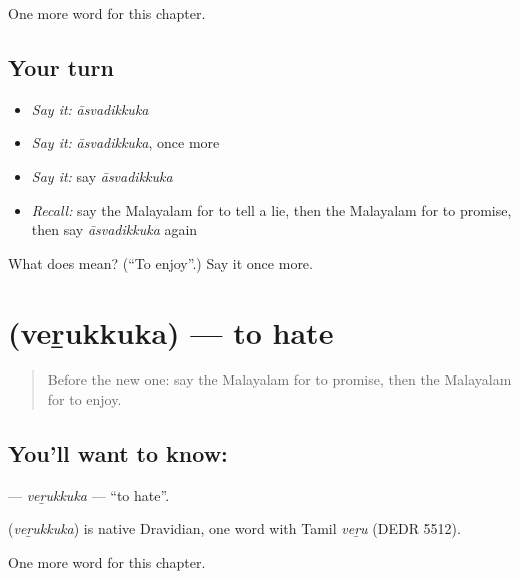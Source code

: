 \begin{grammarlens}[title={What you've built}]
One more word for this chapter.
\end{grammarlens}

\subsection*{Your turn}
\begin{itemize}
\raggedright
  \item \emph{Say it:} \emph{āsvadikkuka}
  \item \emph{Say it:} \emph{āsvadikkuka}, once more
  \item \emph{Say it:} say \emph{āsvadikkuka}
  \item \emph{Recall:} say the Malayalam for to tell a lie, then the Malayalam for to promise, then say \emph{āsvadikkuka} again
\end{itemize}

\begin{tcolorbox}[breakable,colback=teal!4,colframe=teal!35!black,title={Before you move on}]
What does  mean? (\textquotedblleft{}To enjoy\textquotedblright{}.) Say it once more.
\end{tcolorbox}
\section[\texorpdfstring{\ml{വെറുക്കുക} (veṟukkuka)}{വെറുക്കുക (veṟukkuka)}]{ (veṟukkuka) — to hate}

\label{lesson:ML-C228-verukkuka}



\begin{quote}
Before the new one: say the Malayalam for to promise, then the Malayalam for to enjoy.
\end{quote}

\subsection*{You'll want to know: }
\textbf{} — \emph{veṟukkuka} — \textquotedblleft{}to hate\textquotedblright{}.

\begin{cousinweb}
\textbf{} (\emph{veṟukkuka}) is native Dravidian, one word with Tamil \emph{veṟu} (DEDR 5512).
\end{cousinweb}

\begin{grammarlens}[title={What you've built}]
One more word for this chapter.
\end{grammarlens}


